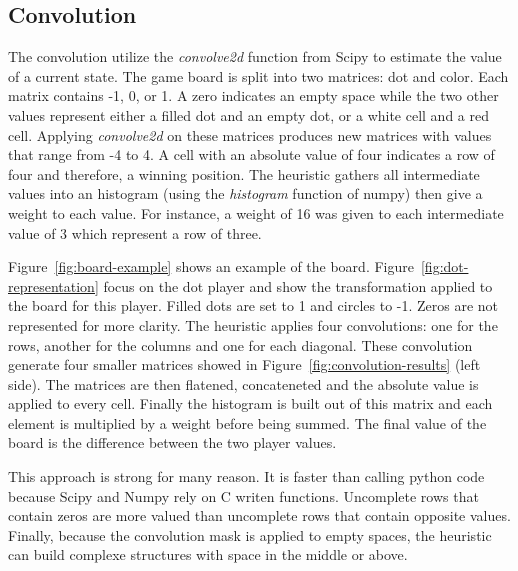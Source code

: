 \documentclass[runningheads]{llncs}
\begin{document}
\subsection{Convolution}
The convolution utilize the \textit{convolve2d} function
from Scipy to estimate the value of a current
state.
The game board is split into two matrices: dot and
color. Each matrix contains -1, 0, or 1. A zero
indicates an empty space while the two other values
represent either a filled dot and an empty dot, or
a white cell and a red cell.
Applying \textit{convolve2d} on these matrices
produces new matrices with values that range from
-4 to 4. A cell with an absolute value of four indicates a row
of four and therefore, a winning position.
The heuristic gathers all intermediate values into
an histogram (using the \textit{histogram}
function of numpy) then give a weight to each
value. For instance, a weight of 16 was given to
each intermediate value of 3 which represent a row
of three.

Figure~\ref{fig:board-example} shows an example of
the board. Figure~\ref{fig:dot-representation}
focus on the dot player and show the
transformation applied to the board for this
player. Filled dots are set to 1 and circles to
-1. Zeros are not represented for more clarity.
The heuristic applies four convolutions: one for
the rows, another for the columns and one for each
diagonal. These convolution generate four smaller
matrices showed in
Figure~\ref{fig:convolution-results} (left side).
The matrices are then flatened, concateneted and the
absolute value is applied to every cell. Finally
the histogram is built out of this matrix and each
element is multiplied by a weight before being
summed.  The final
value of the board is the difference between the
two player values.

This approach is strong for many reason. It is
faster than calling python code because Scipy and
Numpy rely on C writen functions. Uncomplete rows
that contain zeros are more valued than uncomplete
rows that contain opposite values. Finally,
because the convolution mask is applied to empty
spaces, the heuristic can build complexe
structures with space in the middle or above.
\end{document}

